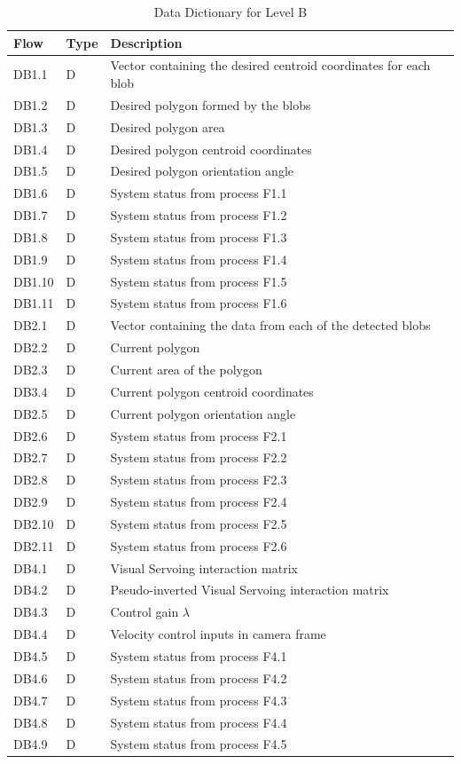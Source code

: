 \begin{table}[!htb]
	\caption{Data Dictionary for Level B}
	\label{tab:DD-LB-a}
	\centering
	\begin{tabular}{lll}
		\toprule
		Flow & Type & Description \\
		\midrule
		DB1.1 & D & Vector containing the desired centroid coordinates for each blob\\
		DB1.2 & D & Desired polygon formed by the blobs \\
		DB1.3 & D & Desired polygon area \\
		DB1.4 & D & Desired polygon centroid coordinates\\
		DB1.5 & D & Desired polygon orientation angle \\
		DB1.6 & D & System status from process F1.1 \\
		DB1.7 & D & System status from process F1.2 \\
		DB1.8 & D & System status from process F1.3 \\
		DB1.9 & D & System status from process F1.4 \\
		DB1.10 & D & System status from process F1.5 \\
		DB1.11 & D & System status from process F1.6 \\
		\midrule
		DB2.1 & D & Vector containing the data from each of the detected blobs \\
		DB2.2 & D & Current polygon \\
		DB2.3 & D & Current area of the polygon \\
		DB3.4 & D & Current polygon centroid coordinates \\
		DB2.5 & D & Current polygon orientation angle \\
		DB2.6 & D & System status from process F2.1 \\
		DB2.7 & D & System status from process F2.2 \\
		DB2.8 & D & System status from process F2.3 \\
		DB2.9 & D & System status from process F2.4 \\
		DB2.10 & D & System status from process F2.5 \\
		DB2.11 & D & System status from process F2.6 \\
		\midrule
		DB4.1 & D & Visual Servoing interaction matrix \\
		DB4.2 & D & Pseudo-inverted Visual Servoing interaction matrix \\
		DB4.3 & D & Control gain $\lambda$ \\
		DB4.4 & D & Velocity control inputs in camera frame \\
		DB4.5 & D & System status from process F4.1 \\
		DB4.6 & D & System status from process F4.2 \\
		DB4.7 & D & System status from process F4.3 \\
		DB4.8 & D & System status from process F4.4 \\
		DB4.9 & D & System status from process F4.5 \\
		\bottomrule
	\end{tabular}
\end{table}

